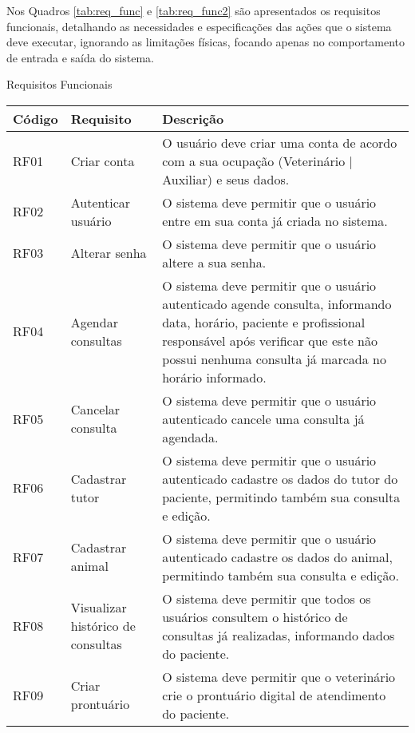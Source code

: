 \documentclass[
    12pt,               %
    openright,          %
    oneside,
    a4paper,            %
    BIBLATEX,           %
    TODO,               %
    english,            %
    brazil              %
    ]{ifsp-spo-inf-ctds}
\begin{document}
            Nos Quadros \ref{tab:req_func} e \ref{tab:req_func2} são apresentados os requisitos funcionais, detalhando as necessidades e especificações das ações que o sistema deve executar, ignorando as limitações físicas, focando apenas no comportamento de entrada e saída do sistema.
            
            \begin{center}
                \begin{quadro}[H]
                \caption{Requisitos Funcionais}
                \begin{tabulary}{1.0\textwidth}{|p{5em}|p{8em}|p{18em}|}
                \hline
                Código & Requisito & Descrição\\
                \hline
                RF01 & Criar conta & O usuário deve criar uma conta de acordo com a sua ocupação (Veterinário | Auxiliar) e seus dados.\\
                \hline
                RF02 & Autenticar usuário & O sistema deve permitir que o usuário entre em sua conta já criada no sistema.\\
                \hline
                RF03 & Alterar senha & O sistema deve permitir que o usuário altere a sua senha.\\
                \hline
                RF04 & Agendar consultas & O sistema deve permitir que o usuário autenticado agende consulta, informando data, horário, paciente e profissional responsável após verificar que este não possui nenhuma consulta já marcada no horário informado.\\
                \hline
                RF05 & Cancelar consulta & O sistema deve permitir que o usuário autenticado cancele uma consulta já agendada.\\
                \hline
                RF06 & Cadastrar tutor & O sistema deve permitir que o usuário autenticado cadastre os dados do tutor do paciente, permitindo também sua consulta e edição.\\
                \hline
                RF07 & Cadastrar animal & O sistema deve permitir que o usuário autenticado cadastre os dados do animal, permitindo também sua consulta e edição.\\
                \hline
                RF08 & Visualizar histórico de consultas & O sistema deve permitir que todos os usuários consultem o histórico de consultas já realizadas, informando dados do paciente.\\
                \hline
                RF09 & Criar prontuário & O sistema deve permitir que o veterinário crie o prontuário digital de atendimento do paciente.\\

\end{tabulary}
\end{quadro}
\end{center}
\end{document}
